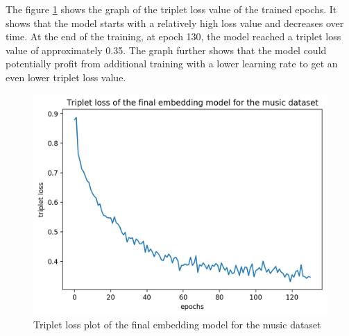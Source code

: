 \newline
The figure \ref{fig:Triplet-Loss-Music} shows the graph of the triplet loss value of the trained epochs. It shows that the model starts with a relatively high loss value and decreases over time. At the end of the training, at epoch 130, the model reached a triplet loss value of approximately 0.35. The graph further shows that the model could potentially profit from additional training with a lower learning rate to get an even lower triplet loss value.
\begin{figure}[ht]
\centering
    \includegraphics[width=0.6\linewidth]{img/triplet_loss_music_final.png}
    \caption{Triplet loss plot of the final embedding model for the music dataset}
    \label{fig:Triplet-Loss-Music}
\end{figure}

